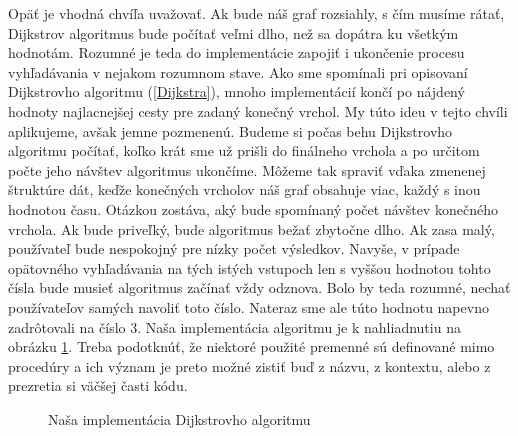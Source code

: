 Opäť je vhodná chvíľa uvažovať. Ak bude náš graf rozsiahly, s čím musíme rátať, Dijkstrov algoritmus bude počítať veľmi dlho, než sa dopátra ku všetkým hodnotám. Rozumné je teda do implementácie zapojiť i ukončenie procesu vyhľadávania v nejakom rozumnom stave. Ako sme spomínali pri opisovaní Dijkstrovho algoritmu (\ref{Dijkstra}), mnoho implementácií končí po nájdený hodnoty najlacnejšej cesty pre zadaný konečný vrchol. My túto ideu v tejto chvíli aplikujeme, avšak jemne pozmenenú. Budeme si počas behu Dijkstrovho algoritmu počítať, koľko krát sme už prišli do finálneho vrchola a po určitom počte jeho návštev algoritmus ukončíme. Môžeme tak spraviť vďaka zmenenej štruktúre dát, keďže konečných vrcholov náš graf obsahuje viac, každý s inou hodnotou času. Otázkou zostáva, aký bude spomínaný počet návštev konečného vrchola. Ak bude priveľký, bude algoritmus bežať zbytočne dlho. Ak zasa malý, používateľ bude nespokojný pre nízky počet výsledkov. Navyše, v prípade opätovného vyhľadávania na tých istých vstupoch len s vyššou hodnotou tohto čísla bude musieť algoritmus začínať vždy odznova. Bolo by teda rozumné, nechať používateľov samých navoliť toto číslo. Nateraz sme ale túto hodnotu napevno zadrôtovali na číslo $3$. Naša implementácia algoritmu je k nahliadnutiu na obrázku \ref{Dijsktra_obr2}. Treba podotknúť, že niektoré použité premenné sú definované mimo procedúry a ich význam je preto možné zistiť buď z názvu, z kontextu, alebo z prezretia si väčšej časti kódu.\newline

\begin{figure}[H]
  \caption{Naša implementácia Dijkstrovho algoritmu}
  \label{Dijsktra_obr2}
\end{figure}

